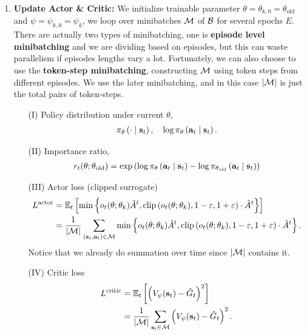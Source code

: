 \documentclass[11pt]{article}  %
\begin{document}
\begin{enumerate}
  \item \textbf{Update Actor \& Critic:} We initialize trainable parameter $\theta = \theta_{k, 0} = \theta_{\text{old}}$ and $\psi = \psi_{k, 0} = \psi_k$, we loop over minibatches $\mathcal{M}$ of $\mathcal{B}$ for several epochs $E$. 
  There are actually two types of minibatching, one is \textbf{episode level minibatching} and we are dividing based on episodes, but this can waste parallelism if episodes lengths vary a lot.
  Fortunately, we can also choose to use the \textbf{token-step minibatching}, constructing $\mathcal{M}$ using token steps from different episodes.
  We use the later minibatching, and in this case $\lvert\mathcal{M}\rvert$ is just the total pairs of token-steps.
  \begin{enumerate}
    \item[(I)] Policy distribution under current $\theta$, 
    \begin{align*}
      \pi_{\theta}\left( \cdot \mid \mathbf{s}_t \right), \quad \log\pi_{\theta}\left( \mathbf{a}_t \mid \mathbf{s}_t \right).
    \end{align*} 
    
    \item[(II)] Importance ratio,
    \begin{align*}
      r_t(\theta; \theta_{\text{old}}) = \exp\left( \log \pi_{\theta}\left( \mathbf{a}_t \mid \mathbf{s}_t \right) - \log \pi_{\theta_{\text{old}}}\left( \mathbf{a}_t \mid \mathbf{s}_t \right) \right)
    \end{align*} 

    \item[(III)] Actor loss (clipped surrogate)
    \begin{align*}
      L^{\text{actor}} &= \mathbb{E}_{t}\left[\min\left\{ o_t(\theta; \theta_k) \hat{A}^t, \text{clip}\left( o_t(\theta; \theta_k), 1-\varepsilon, 1+\varepsilon \right)\cdot\hat{A}^t \right\}\right] \\
      &= \frac{1}{\lvert\mathcal{M}\rvert} \sum_{\left( \mathbf{s}_t, \mathbf{a}_t \right) \in \mathcal{M}} \min\left\{ o_t(\theta; \theta_k) \hat{A}^t, \text{clip}\left( o_t(\theta; \theta_k), 1-\varepsilon, 1+\varepsilon \right)\cdot\hat{A}^t \right\}.
    \end{align*}
    Notice that we already do summation over time since $\lvert\mathcal{M}\rvert$ contains it. 

    \item[(IV)] Critic loss 
    \begin{align*}
      L^{\text{critic}} &= \mathbb{E}_{t}\left[\left( V_{\psi}(\mathbf{s}_t) - \hat{G}_t \right)^2\right] \\
      &= \frac{1}{\lvert\mathcal{M}\rvert} \sum_{\mathbf{s}_t \in \mathcal{M}}\left( V_{\psi}(\mathbf{s}_t) - \hat{G}_t \right)^2.
    \end{align*}


\end{enumerate}
\end{enumerate}
\end{document}

